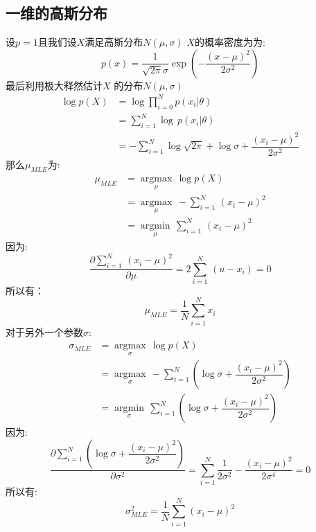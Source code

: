 \documentclass[withoutpreface,bwprint]{cumcmthesis} %
\begin{document}
	\subsection*{一维的高斯分布}
	设$p=1$且我们设$X$满足高斯分布$N(\mu,\sigma)$
	$X$的概率密度为为:
	\begin{equation}
		p(x)=\dfrac{1}{\sqrt{2\pi}\sigma} \exp{(-\dfrac{(x-\mu)^2}{2\sigma^2} )}
	\end{equation}
	最后利用极大释然估计$X$ 的分布$N(\mu,\sigma)$
	\begin{align*}
		\log {p(X)} & = \log\prod \limits_{i=0}^N{p\left(x_i|{\theta}\right)} \\
				 &= \sum_{i=1}^N \log \,{p\left(x_i|{\theta}\right)}\\
				 &=-\sum_{i=1}^N \log{\sqrt{2\pi}}+\log{\sigma}+\dfrac{{(x_i-\mu)}^2}{2\sigma^2}				 
	\end{align*}
	那么$\mu_{MLE}$为:
	\begin{align*}
		\mu_{MLE} & ={\mathop{argmax}\limits_{\mu}}\,{\log {p(X)}}\\
		&={\mathop{argmax}\limits_{\mu}}\,-\sum_{i=1}^N \,{(x_i-\mu)}^2 \\
		&={\mathop{argmin}\limits_{\mu}}\,\sum_{i=1}^N \,{(x_i-\mu)}^2
	\end{align*}
	因为:
	\begin{equation}
		\frac{\partial \sum_{i=1}^N \,{{(x_i-\mu)}^2}}{\partial \mu}=2 \sum_{i=1}^N \,{(u-x_i)}=0
	\end{equation}
	所以有：
	\begin{equation}
		\mu_{MLE}=\dfrac{1}{N} \sum_{i=1}^N{x_i}
	\end{equation}
	对于另外一个参数$\sigma$:
	\begin{align*}
		\sigma_{MLE}&= {\mathop{argmax}\limits_{\sigma}}\,{\log {p(X)}}\\
		&={\mathop{argmax}\limits_{\sigma}}\,-\sum_{i=1}^N(\log{\sigma}+\dfrac{{(x_i-\mu)}^2}{2\sigma^2})\\
		&={\mathop{argmin}\limits_{\sigma}}\,\sum_{i=1}^N(\log{\sigma}+\dfrac{{(x_i-\mu)}^2}{2\sigma^2})		
	\end{align*}
	因为:
	\begin{equation}
		\frac{\partial  \sum_{i=1}^N(\log{\sigma}+\dfrac{{(x_i-\mu)}^2}{2\sigma^2})}{\partial \sigma^2}=\sum_{i=1}^N \dfrac{1}{2\sigma^2}-\dfrac{{(x_i-\mu)}^2}{2\sigma^4}=0
	\end{equation}
	所以有:
	\begin{equation}
		\sigma^2_{MLE}=\dfrac{1}{N}\sum_{i=1}^N{(x_i-\mu)^2}
	\end{equation}
\end{document}
